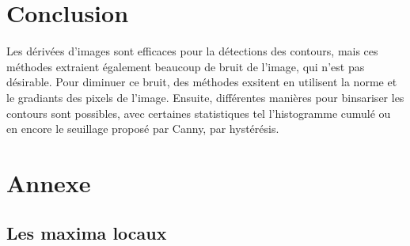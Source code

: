 \documentclass[a4paper,11pt]{article}
\begin{document}
  \section{Conclusion}
  Les dérivées d'images sont efficaces pour la détections des contours, mais ces méthodes 
  extraient également beaucoup de bruit de l'image, qui n'est pas désirable. Pour diminuer ce bruit, des méthodes
  exsitent en utilisent la norme et le gradiants des pixels de l'image. Ensuite, différentes manières pour 
  binsariser les contours sont possibles, avec certaines statistiques tel l'histogramme cumulé ou en encore 
  le seuillage proposé par Canny, par hystérésis.
  
  
  \newpage
  
  \section{Annexe}
  
  \subsection{Les maxima locaux}
  
\end{document}
